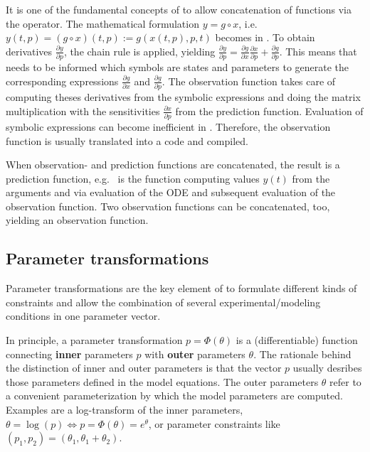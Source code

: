 \documentclass[article]{jss}
\begin{document}
It is one of the fundamental concepts of  to allow concatenation of functions via the  operator. The mathematical formulation $y = g\circ x$, i.e.~$y(t, p) = (g\circ x)(t, p):= g(x(t, p), p, t)$ becomes  in . To obtain derivatives $\frac{\partial y}{\partial p}$, the chain rule is applied, yielding $\frac{\partial y}{\partial p} = \frac{\partial g}{\partial x}\frac{\partial x}{\partial p} + \frac{\partial g}{\partial p}$. This means that  needs to be informed which symbols are states and parameters to generate the corresponding expressions $\frac{\partial g}{\partial x}$ and $\frac{\partial g}{\partial p}$. The observation function  takes care of computing theses derivatives from the symbolic expressions and doing the matrix multiplication with the sensitivities $\frac{\partial x}{\partial p}$ from the prediction function. Evaluation of symbolic expressions can become inefficient in . Therefore, the observation function is usually translated into a  code and compiled.

When observation- and prediction functions are concatenated, the result is a prediction function, e.g.~ is the  function computing values $y(t)$ from the arguments  and  via evaluation of the ODE and subsequent evaluation of the observation function. Two observation functions can be concatenated, too, yielding an observation function.

\subsection{Parameter transformations}

Parameter transformations are the key element of  to formulate different kinds of constraints and allow the combination of several experimental/modeling conditions in one parameter vector.

In principle, a parameter transformation $p = \Phi(\theta)$ is a (differentiable) function connecting \textbf{inner} parameters $p$ with \textbf{outer} parameters $\theta$. The rationale behind the distinction of inner and outer parameters is that the vector $p$ usually desribes those parameters defined in the model equations. The outer parameters $\theta$ refer to a convenient parameterization by which the model parameters are computed. Examples are a log-transform of the inner parameters, $\theta = \log(p) \Leftrightarrow p = \Phi(\theta) = e^{\theta}$, or parameter constraints like $(p_1, p_2) = (\theta_1, \theta_1 + \theta_2)$.
\end{document}
